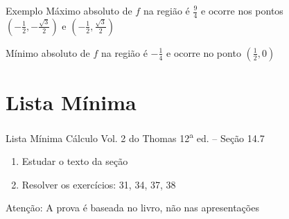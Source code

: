 \begin{frame}{Exemplo \theexemplo}
  Máximo absoluto de $f$ na região é \(\frac{9}{4}\) e ocorre nos pontos \\
  \(\left(-\frac{1}{2}, -\frac{\sqrt{3}}{2}\right)\) e
  \(\left(-\frac{1}{2},  \frac{\sqrt{3}}{2}\right)\)

  \vspace{\baselineskip}
  Mínimo absoluto de $f$ na região é \(-\frac{1}{4}\)
  e ocorre no ponto
  \(\left(\frac{1}{2}, 0\right)\)
\end{frame}

\section{Lista Mínima}

\begin{frame}{Lista Mínima}
  Cálculo Vol. 2 do Thomas 12\textsuperscript{a} ed. -- Seção 14.7
  \begin{enumerate}
    \item Estudar o texto da seção
    \item Resolver os exercícios: 31, 34, 37, 38
  \end{enumerate}

  \vfill
  Atenção: A prova é baseada no livro, não nas apresentações
\end{frame}


